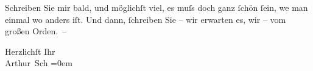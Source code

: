 \pstart
           Schreiben Sie mir bald, und möglichſt viel, es muſs doch ganz ſchön ſein, we{\geminationn} man einmal wo anders iſt. Und dann, ſchreiben Sie –
               wir erwarten es, wir – vom großen Orden. –\pend
           
\pstart
           {\pb}Herzlichſt Ihr{\\[\baselineskip]}\spacefill\mbox{Arthur Sch}\pend
           \leftskip=0em{}\endnumbering{}  
      